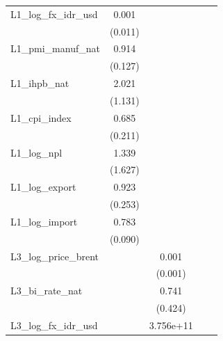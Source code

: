{\begin{tabular}{l*{4}{c}}
\addlinespace
L1\_log\_fx\_idr\_usd&    0.001         &                  &                  &                  \\
                &  (0.011)         &                  &                  &                  \\
\addlinespace
L1\_pmi\_manuf\_nat&    0.914         &                  &                  &                  \\
                &  (0.127)         &                  &                  &                  \\
\addlinespace
L1\_ihpb\_nat     &    2.021         &                  &                  &                  \\
                &  (1.131)         &                  &                  &                  \\
\addlinespace
L1\_cpi\_index    &    0.685         &                  &                  &                  \\
                &  (0.211)         &                  &                  &                  \\
\addlinespace
L1\_log\_npl      &    1.339         &                  &                  &                  \\
                &  (1.627)         &                  &                  &                  \\
\addlinespace
L1\_log\_export   &    0.923         &                  &                  &                  \\
                &  (0.253)         &                  &                  &                  \\
\addlinespace
L1\_log\_import   &    0.783\sym{**} &                  &                  &                  \\
                &  (0.090)         &                  &                  &                  \\
\addlinespace
L3\_log\_price\_brent&                  &    0.001\sym{***}&                  &                  \\
                &                  &  (0.001)         &                  &                  \\
\addlinespace
L3\_bi\_rate\_nat  &                  &    0.741         &                  &                  \\
                &                  &  (0.424)         &                  &                  \\
\addlinespace
L3\_log\_fx\_idr\_usd&                  &3.756e+11\sym{***}&                  &                  \\

\end{tabular}}
